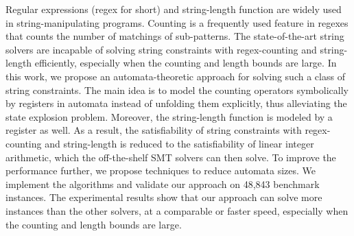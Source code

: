 Regular expressions (regex for short) and string-length function are widely used in string-manipulating programs. Counting is a frequently used feature in regexes that counts the number of matchings of sub-patterns. 
The state-of-the-art string solvers are incapable of solving string constraints with regex-counting and string-length eﬀiciently, especially when the counting and length bounds are large. 
In this work, we propose an automata-theoretic approach for solving such a class of string constraints. 
The main idea is to model the counting operators symbolically by registers in automata instead of unfolding them explicitly, thus alleviating the state explosion problem. Moreover, the string-length function is modeled by a register as well. 
As a result, the satisfiability of string constraints with regex-counting and string-length is reduced to the satisfiability of linear integer arithmetic, which the off-the-shelf SMT solvers can then solve. 
To improve the performance further, we propose techniques to reduce automata sizes. We implement the algorithms and validate our approach on 48,843 benchmark instances. 
The experimental results show that our approach can solve more instances than the other solvers, at a comparable or faster speed, especially when the counting and length bounds are large.

%